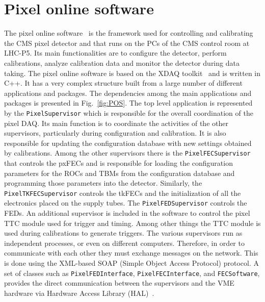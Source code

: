 \section{Pixel online software}\label{sec:BPix_POS}

The pixel online software~\cite{POSCalib} is the framework used for controlling and calibrating the CMS pixel detector and that runs on the PCs of the CMS control room at LHC-P5.
Its main functionalities are to configure the detector, perform calibrations, analyze calibration data and monitor the detector during data taking.
The pixel online software is based on the XDAQ toolkit~\cite{Brigljevic:2003kg} and is written in C++. It has a very complex structure built from a large number of different applications and packages.
The dependencies among the main applications and packages is presented in Fig.~\ref{fig:POS}.
The top level application is represented by the \texttt{PixelSupervisor} which is responsible for the overall coordination of the pixel DAQ.
Its main function is to coordinate the activities of the other supervisors, particularly during configuration and calibration.
It is also responsible for updating the configuration database with new settings obtained by calibrations.
Among the other supervisors there is the \texttt{PixelFECSupervisor} that controls the pxFECs and is responsible for loading the configuration parameters for the ROCs and TBMs from the configuration database and programming those parameters into the detector.
Similarly, the \texttt{PixelTKFECSupervisor} controls the tkFECs and the initialization of all the electronics placed on the supply tubes. The \texttt{PixelFEDSupervisor} controls the FEDs.
An additional supervisor is included in the software to control the pixel TTC module used for trigger and timing. Among other things the TTC module is used during calibrations to generate triggers.
The various supervisors run as independent processes, or even on different computers. Therefore, in order to communicate with each other they must exchange messages on the network. This is done using the XML-based SOAP (Simple Object Access Protocol) protocol.
A set of classes such as \texttt{PixelFEDInterface}, \texttt{PixelFECInterface}, and \texttt{FECSoftware}, provides the direct communication between the supervisors and the VME hardware via Hardware Access Library (HAL)~\cite{HAL}.

